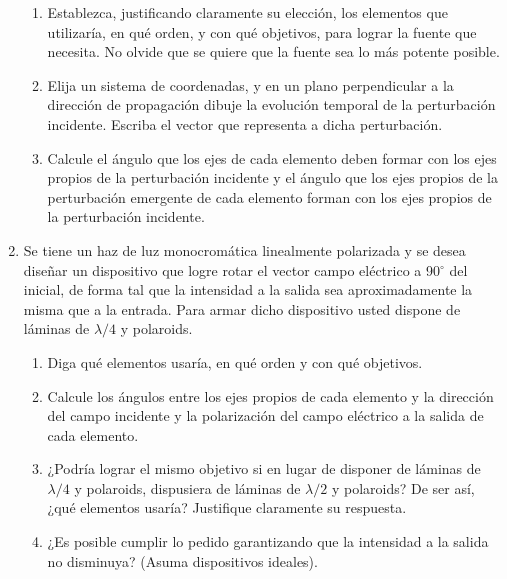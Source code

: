 \documentclass[11pt,spanish]{article}
\begin{document}
\begin{enumerate}
    \begin{enumerate}
        \item Establezca, justificando claramente su elección, los elementos que
        utilizaría, en qué orden, y con qué objetivos, para lograr la fuente
        que necesita. No olvide que se quiere que la fuente sea lo más potente
        posible.

        \item Elija un sistema de coordenadas, y en un plano perpendicular a la
        dirección de propagación dibuje la evolución temporal de la perturbación
        incidente. Escriba el vector que representa a dicha perturbación.

        \item Calcule el ángulo que los ejes de cada elemento deben formar con
        los ejes propios de la perturbación incidente y el ángulo que los ejes
        propios de la perturbación emergente de cada elemento forman con los
        ejes propios de la perturbación incidente.
    \end{enumerate}
    

    \item Se tiene un haz de luz monocromática linealmente polarizada y se desea
    diseñar un dispositivo que logre rotar el vector campo eléctrico a
    90$^{\circ}$ del inicial, de forma tal que la intensidad a la salida
    sea aproximadamente la misma que a la entrada. Para armar dicho dispositivo
    usted dispone de láminas de $\lambda/4$ y polaroids.
    
    \begin{enumerate}
        \item Diga qué elementos usaría, en qué orden y con qué objetivos.

        \item Calcule los ángulos entre los ejes propios de cada elemento y la
        dirección del campo incidente y la polarización del campo eléctrico a la
        salida de cada elemento.

        \item ¿Podría lograr el mismo objetivo si en lugar de disponer de
        láminas de $\lambda/4$ y polaroids, dispusiera de láminas de $\lambda/2$
        y polaroids? De ser así, ¿qué elementos usaría? Justifique claramente su
        respuesta.

        \item ¿Es posible cumplir lo pedido garantizando que la intensidad a la
        salida no disminuya? (Asuma dispositivos ideales).
    \end{enumerate}


\end{enumerate}
\end{document}
